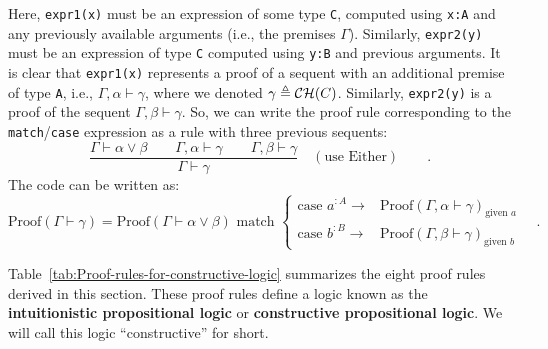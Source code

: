 \noindent Here, \lstinline!expr1(x)! must be an expression of some
type \lstinline!C!, computed using \lstinline!x:A! and any previously
available arguments (i.e., the premises $\Gamma$). Similarly, \lstinline!expr2(y)!
must be an expression of type \lstinline!C! computed using \lstinline!y:B!
and previous arguments. It is clear that \lstinline!expr1(x)! represents
a proof of a sequent with an additional premise of type \lstinline!A!,
i.e., $\Gamma,\alpha\vdash\gamma$, where we denoted $\gamma\triangleq{\cal CH}(C)$.
Similarly, \lstinline!expr2(y)! is a proof of the sequent $\Gamma,\beta\vdash\gamma$.
So, we can write the proof rule corresponding to the \lstinline!match!/\lstinline!case!
expression as a rule with three previous sequents:
\[
\frac{\Gamma\vdash\alpha\vee\beta\quad\quad\Gamma,\alpha\vdash\gamma\quad\quad\Gamma,\beta\vdash\gamma}{\Gamma\vdash\gamma}\quad(\text{use Either})\quad\quad.
\]
The code can be written as:
\[
\text{Proof}\left(\Gamma\vdash\gamma\right)=\text{Proof}\left(\Gamma\vdash\alpha\vee\beta\right)\text{ match }\begin{cases}
\text{case }a^{:A}\rightarrow & \text{Proof}\left(\Gamma,\alpha\vdash\gamma\right)_{\text{given }a}\\
\text{case }b^{:B}\rightarrow & \text{Proof}\left(\Gamma,\beta\vdash\gamma\right)_{\text{given }b}
\end{cases}\quad.
\]

Table~\ref{tab:Proof-rules-for-constructive-logic} summarizes the
eight proof rules derived in this section. These proof rules define
a logic known as the \textbf{intuitionistic
propositional logic} or \textbf{constructive
propositional logic}. We will call this logic \textsf{``}constructive\textsf{''} for
short.

